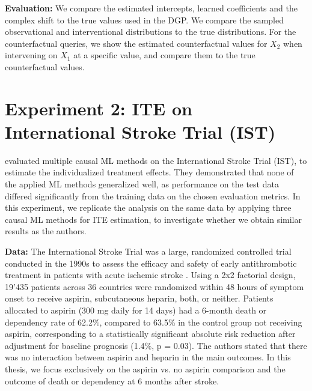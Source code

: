 \textbf{Evaluation: } We compare the estimated intercepts, learned coefficients and the complex shift to the true values used in the DGP. We compare the sampled observational and interventional distributions to the true distributions. For the counterfactual queries, we show the estimated counterfactual values for \(X_2\) when intervening on \(X_1\) at a specific value, and compare them to the true counterfactual values.




\section{Experiment 2: ITE on International Stroke Trial (IST)} \label{sec:methods_experiment2}





% 
% 
\citet{chen2025} evaluated multiple causal ML methods on the International Stroke Trial (IST), to estimate the individualized treatment effects. They demonstrated that none of the applied ML methods generalized well, as performance on the test data differed significantly from the training data on the chosen evaluation metrics.
In this experiment, we replicate the analysis on the same data by applying three causal ML methods for ITE estimation, to investigate whether we obtain similar results as the authors.


\textbf{Data:} The International Stroke Trial was a large, randomized controlled trial conducted in the 1990s to assess the efficacy and safety of early antithrombotic treatment in patients with acute ischemic stroke \citep{IST1997}. Using a 2x2 factorial design, 19'435 patients across 36 countries were randomized within 48 hours of symptom onset to receive aspirin, subcutaneous heparin, both, or neither. Patients allocated to aspirin (300 mg daily for 14 days) had a 6-month death or dependency rate of 62.2\%, compared to 63.5\% in the control group not receiving aspirin, corresponding to a statistically significant absolute risk reduction after adjustment for baseline prognosis (1.4\%, p = 0.03). The authors stated that there was no interaction between aspirin and heparin in the main outcomes. In this thesis, we focus exclusively on the aspirin vs. no aspirin comparison and the outcome of death or dependency at 6 months after stroke.

